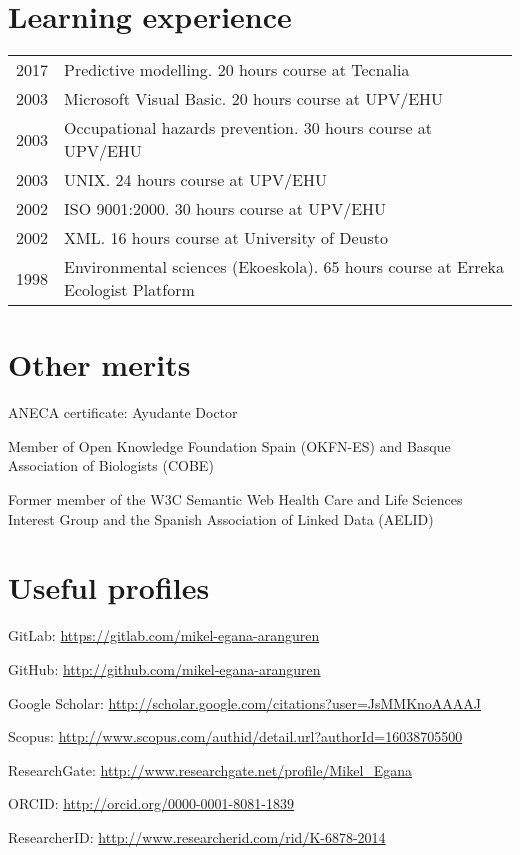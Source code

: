 \documentclass[11pt,fullpage]{article}
\renewenvironment{itemize}{
  \begin{list}{}{
    \setlength{\leftmargin}{1.5em}
  }
}{
  \end{list}
}
\begin{document}
\section*{Learning experience}
\begin{longtable}{p{0.5in}|p{5.5in}}
2017 & Predictive modelling. 20 hours course at Tecnalia \\
2003 & Microsoft Visual Basic. 20 hours course at UPV/EHU \\
2003 & Occupational hazards prevention.  30 hours course at UPV/EHU \\
2003 & UNIX. 24 hours course at UPV/EHU \\
2002 & ISO 9001:2000. 30 hours course at UPV/EHU \\
2002 & XML. 16 hours course at University of Deusto \\
1998 & Environmental sciences (Ekoeskola). 65 hours course at Erreka Ecologist Platform \\
\end{longtable}

\section*{Other merits}
\begin{itemize}
	\item ANECA certificate: Ayudante Doctor
	\item Member of Open Knowledge Foundation Spain (OKFN-ES) and Basque Association of Biologists (COBE)
	\item Former member of the W3C Semantic Web Health Care and Life Sciences Interest Group and the Spanish Association of Linked Data (AELID)
\end{itemize}

\section*{Useful profiles}
\begin{itemize}
  \item GitLab: \href{https://gitlab.com/mikel-egana-aranguren}{https://gitlab.com/mikel-egana-aranguren}
	\item GitHub: \href{http://github.com/mikel-egana-aranguren}{http://github.com/mikel-egana-aranguren}
	\item Google Scholar: \href{http://scholar.google.com/citations?user=JsMMKnoAAAAJ}{http://scholar.google.com/citations?user=JsMMKnoAAAAJ}
	\item Scopus: \href{http://www.scopus.com/authid/detail.url?authorId=16038705500}{http://www.scopus.com/authid/detail.url?authorId=16038705500}
	\item ResearchGate: \href{http://www.researchgate.net/profile/Mikel_Egana}{http://www.researchgate.net/profile/Mikel\_Egana}
	\item ORCID: \href{http://orcid.org/0000-0001-8081-1839}{http://orcid.org/0000-0001-8081-1839}
	\item ResearcherID: \href{http://www.researcherid.com/rid/K-6878-2014}{http://www.researcherid.com/rid/K-6878-2014}
\end{itemize}
\end{document}
